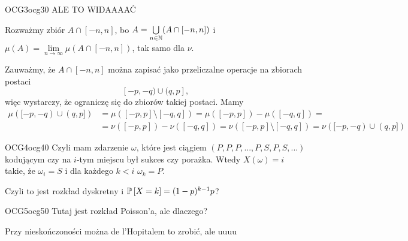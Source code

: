 \documentclass{article}
\begin{document}

\begin{ocg}{OCG3}{ocg3}{0}
ALE TO WIDAAAAĆ

Rozważmy zbiór $A\cap [-n,n]$, bo $A=\bigcup\limits_{n\in\mathbb{N}}(A\cap[-n,n])$ i $\mu(A)=\lim\limits_{n\to\infty}\mu(A\cap [-n,n])$, tak samo dla $\nu$. 

Zauważmy, że $A\cap[-n,n]$ można zapisać jako przeliczalne operacje na zbiorach postaci
$$[-p,-q)\cup(q, p],$$
więc wystarczy, że ograniczę się do zbiorów takiej postaci. Mamy
\begin{align*}
    \mu([-p,-q)\cup(q,p])&=\mu([-p,p]\setminus[-q,q])=\mu([-p,p])-\mu([-q,q])=\\
    &=\nu([-p,p])-\nu([-q,q])=\nu([-p,p]\setminus[-q,q])=\nu([-p,-q)\cup(q,p])
\end{align*}
\end{ocg}


\begin{ocg}{OCG4}{ocg4}{0}
Czyli mam zdarzenie $\omega$, które jest ciągiem $(P, P, P, ..., P, S, P, S,...)$ kodującym czy na $i$-tym miejscu był sukces czy porażka. Wtedy $X(\omega)=i$ takie, że $\omega_i=S$ i dla każdego $k<i$ $\omega_k=P$.

Czyli to jest rozkład dyskretny i $\prob{X=k}=(1-p)^{k-1}p$?
\end{ocg}



\begin{ocg}{OCG5}{ocg5}{0}
Tutaj jest rozkład Poisson'a, ale dlaczego?

Przy nieskończoności można de l'Hopitalem to zrobić, ale uuuu
\end{ocg}
\end{document}
